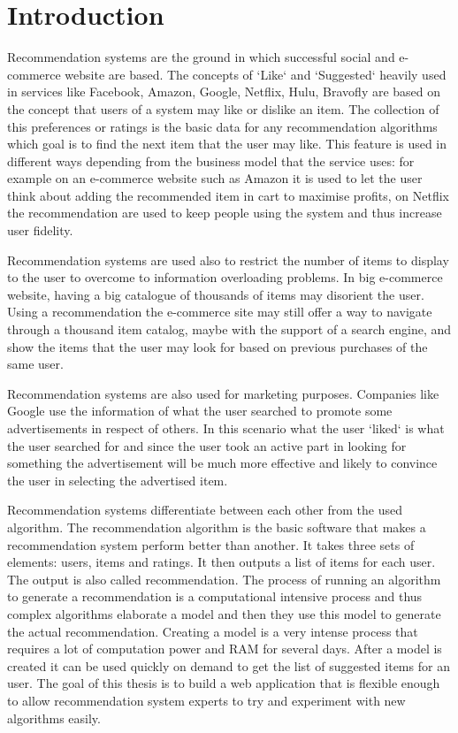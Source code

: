\chapter{Introduction}
\label{chapter:<Introduction>}

\acresetall

Recommendation systems are the ground in which successful social and e-commerce website are based. The concepts of `Like` and `Suggested` heavily used in services like Facebook, Amazon, Google, Netflix, Hulu, Bravofly are based on the concept that users of a system may like or dislike an item. The collection of this preferences or ratings is the basic data for any recommendation algorithms which goal is to find the next item that the user may like. This feature is used in different ways depending from the business model that the service uses: for example on an e-commerce website such as Amazon it is used to let the user think about adding the recommended item in cart to maximise profits, on Netflix the recommendation are used to keep people using the system and thus increase user fidelity.

Recommendation systems are used also to restrict the number of items to display to the user to overcome to information overloading problems. In big e-commerce website, having a big catalogue of thousands of items may disorient the user. Using a recommendation the e-commerce site may still offer a way to navigate through a thousand item catalog, maybe with the support of a search engine, and show the items that the user may look for based on previous purchases of the same user.

Recommendation systems are also used for marketing purposes. Companies like Google use the information of what the user searched to promote some advertisements in respect of others. In this scenario what the user `liked` is what the user searched for and since the user took an active part in looking for something the advertisement will be much more effective and likely to convince the user in selecting the advertised item.

Recommendation systems differentiate between each other from the used algorithm. The recommendation algorithm is the basic software that makes a recommendation system perform better than another. It takes three sets of elements: users, items and ratings. It then outputs a list of items for each user. The output is also called recommendation. The process of running an algorithm to generate a recommendation is a computational intensive process and thus complex algorithms elaborate a model and then they use this model to generate the actual recommendation. Creating a model is a very intense process that requires a lot of computation power and RAM for several days. After a model is created it can be used quickly on demand to get the list of suggested items for an user. The goal of this thesis is to build a web application that is flexible enough to allow recommendation system experts to try and experiment with new algorithms easily.

